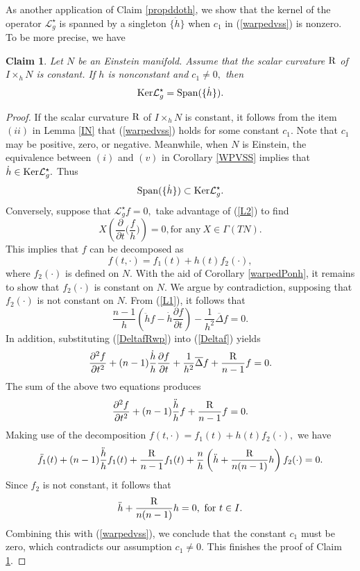 \documentclass[10pt,leqno,oneside]{amsart}
\newtheorem{Cla}{Claim}
\begin{document}
{        As another application of Claim \ref{propddoth}, we show that the kernel of the operator $\mathcal{L}_g^{\star}$ is spanned by a singleton $\{\dot{h}\}$ when $c_1$ in (\ref{warpedvss}) is nonzero. To be more precise, we have
    \begin{Cla}\label{dimKwar}
        Let $N$ be an Einstein manifold. Assume that the scalar curvature $\rm{R}$ of $I\times_hN$ is constant. If $h$ is nonconstant and $c_1\neq0,$ then
        \[{\rm{Ker}}\mathcal{L}_g^{\star}={\rm{Span}}(\{\dot{h}\}).\]
    \end{Cla}
    \begin{proof}
        If the scalar curvature $\rm{R}$ of $I\times_hN$ is constant, it follows from the item $(ii)$ in Lemma \ref{IN} that (\ref{warpedvss}) holds for some constant $c_1$. Note that $c_1$ may be positive, zero, or negative. Meanwhile, when $N$ is Einstein, the equivalence between $(i)$ and $(v)$ in Corollary \ref{WPVSS} implies that $\dot{h}\in{\rm{Ker}}\mathcal{L}_g^{\star}.$ Thus
        \[{\rm{Span}}(\{\dot{h}\})\subset{\rm{Ker}}\mathcal{L}_g^{\star}.\]
        Conversely, suppose that $\mathcal{L}_g^{\star}f=0,$ take advantage of (\ref{L2}) to find
        \[X\left(\frac{\partial}{\partial t}\Big(\frac{f}{h}\Big)\right)=0, \text{for any}~ X\in\Gamma(TN).\]
        This implies that $f$ can be decomposed as
        $$f(t,\cdot)=f_1(t)+h(t)f_2(\cdot),$$
        where $f_2(\cdot)$ is defined on $N.$ With the aid of Corollary \ref{warpedPonh}, it remains to show that $f_2(\cdot)$ is constant on $N.$ We argue by contradiction, supposing that $f_2(\cdot)$ is not constant on $N.$ From (\ref{L1}), it follows that
        \[\frac{n-1}{h}\left(\ddot{h}f-\dot{h}\frac{\partial f}{\partial t}\right)-\frac{1}{h^2}\overline{\Delta}f=0.\]
        In addition, substituting (\ref{DeltafRwp}) into (\ref{Deltaf}) yields
        \[\frac{\partial^2f}{\partial t^2}+(n-1)\frac{\dot{h}}{h}\frac{\partial f}{\partial t}+\frac{1}{h^2}\overline{\Delta}f+\frac{{\rm R}}{n-1}f=0.\]
        The sum of the above two equations produces
        \[\frac{\partial^2f}{\partial t^2}+(n-1)\frac{\ddot{h}}{h}f+\frac{{\rm R}}{n-1}f=0.\]
        Making use of the decomposition $f(t,\cdot)=f_1(t)+h(t)f_2(\cdot),$ we have
        \[\ddot{f}_1(t)+(n-1)\frac{\ddot{h}}{h}f_1(t)+\frac{{\rm R}}{n-1}f_1(t)+\frac{n}{h}\left(\ddot{h}+\frac{{\rm R}}{n(n-1)}h\right)f_2(\cdot)=0.\]
        Since $f_2$ is not constant, it follows that
        \[\ddot{h}+\frac{{\rm R}}{n(n-1)}h=0,~\text{for}~ t\in I.\]
        Combining this with (\ref{warpedvss}), we conclude that the constant \(c_1\) must be zero, which contradicts our assumption $c_1\neq0$. This finishes the proof of Claim \ref{dimKwar}.
    \end{proof}

}
\end{document}
